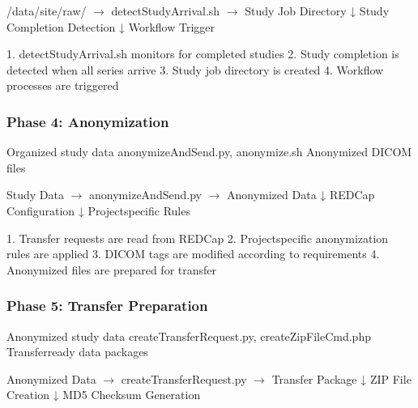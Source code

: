 \documentclass[letterpaper,10pt,english]{sphinxmanual}
\begin{document}
\begin{sphinxVerbatim}[commandchars=\\\{\}]
/data/site/raw/ \(\rightarrow\) detectStudyArrival.sh \(\rightarrow\) Study Job Directory
                   ↓
            Study Completion Detection
                   ↓
            Workflow Trigger
\end{sphinxVerbatim}

\sphinxAtStartPar
{}
1. detectStudyArrival.sh monitors for completed studies
2. Study completion is detected when all series arrive
3. Study job directory is created
4. Workflow processes are triggered


\subsubsection{Phase 4: Anonymization}
\label{\detokenize{Architecture/data-flow:phase-4-anonymization}}
\sphinxAtStartPar
{} Organized study data
 anonymizeAndSend.py, anonymize.sh
 Anonymized DICOM files

\begin{sphinxVerbatim}[commandchars=\\\{\}]
Study Data \(\rightarrow\) anonymizeAndSend.py \(\rightarrow\) Anonymized Data
               ↓
        REDCap Configuration
               ↓
        Project\PYGZhy{}specific Rules
\end{sphinxVerbatim}

\sphinxAtStartPar
{}
1. Transfer requests are read from REDCap
2. Project\sphinxhyphen{}specific anonymization rules are applied
3. DICOM tags are modified according to requirements
4. Anonymized files are prepared for transfer


\subsubsection{Phase 5: Transfer Preparation}
\label{\detokenize{Architecture/data-flow:phase-5-transfer-preparation}}
\sphinxAtStartPar
{} Anonymized study data
 createTransferRequest.py, createZipFileCmd.php
 Transfer\sphinxhyphen{}ready data packages

\begin{sphinxVerbatim}[commandchars=\\\{\}]
Anonymized Data \(\rightarrow\) createTransferRequest.py \(\rightarrow\) Transfer Package
                     ↓
              ZIP File Creation
                     ↓
              MD5 Checksum Generation
\end{sphinxVerbatim}
\end{document}
